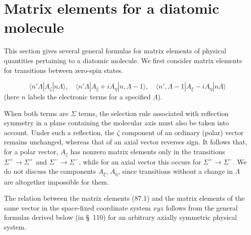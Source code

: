 \section{Matrix elements for a diatomic molecule}

This section gives several general formulas for matrix elements of physical quantities pertaining to a diatomic molecule. We first consider matrix elements for transitions between zero-spin states.


\begin{equation}
\langle n'\Lambda|A_\zeta|n\Lambda\rangle,\quad
\langle n'\Lambda|A_\xi+iA_\eta|n,\Lambda-1\rangle,\quad
\langle n',\Lambda-1|A_\xi-iA_\eta|n\Lambda\rangle
\tag{87.1}
\end{equation}
(here $n$ labels the electronic terms for a specified $\Lambda$).

When both terms are $\Sigma$ terms, the selection rule associated with reflection symmetry in a plane containing the molecular axis must also be taken into account. Under such a reflection, the $\zeta$ component of an ordinary (polar) vector remains unchanged, whereas that of an axial vector reverses sign. It follows that, for a polar vector, $A_\zeta$ has nonzero matrix elements only in the transitions $\Sigma^+\to\Sigma^+$ and $\Sigma^-\to\Sigma^-$, while for an axial vector this occurs for $\Sigma^+\to\Sigma^-$. We do not discuss the components $A_\xi$, $A_\eta$, since transitions without a change in $\Lambda$ are altogether impossible for them.



The relation between the matrix elements (87.1) and the matrix elements of the same vector in the space-fixed coordinate system $xyz$ follows from the general formulas derived below (in \S~110) for an arbitrary axially symmetric physical system.

